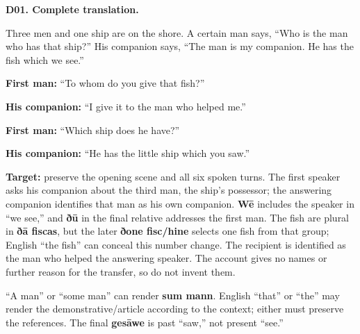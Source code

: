 \par\begin{minipage}{\linewidth}\raggedright
\textbf{D01. Complete translation.}

Three men and one ship are on the shore. A certain man says, “Who is the man who has that ship?” His companion says, “The man is my companion. He has the fish which we see.”

\textbf{First man:} “To whom do you give that fish?”

\textbf{His companion:} “I give it to the man who helped me.”

\textbf{First man:} “Which ship does he have?”

\textbf{His companion:} “He has the little ship which you saw.”

\textbf{Target:} preserve the opening scene and all six spoken turns. The first speaker asks his companion about the third man, the ship's possessor; the answering companion identifies that man as his own companion. \textbf{Wē} includes the speaker in “we see,” and \textbf{ðū} in the final relative addresses the first man. The fish are plural in \textbf{ðā fiscas}, but the later \textbf{ðone fisc/\allowbreak{}hine} selects one fish from that group; English “the fish” can conceal this number change. The recipient is identified as the man who helped the answering speaker. The account gives no names or further reason for the transfer, so do not invent them.

“A man” or “some man” can render \textbf{sum mann}. English “that” or “the” may render the demonstrative/\allowbreak{}article according to the context; either must preserve the references. The final \textbf{gesāwe} is past “saw,” not present “see.”

\end{minipage}\par\addvspace{4pt}

